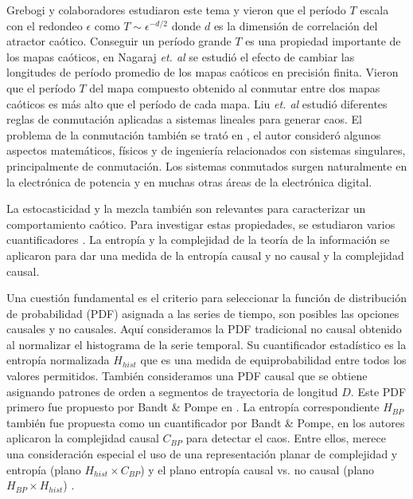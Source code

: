 Grebogi y colaboradores \cite{Grebogi1988} estudiaron este tema y vieron que el período $T$ escala con el redondeo $\epsilon$ como $T\sim\epsilon^{-d/2}$ donde $d$ es la dimensión de correlación del atractor caótico.
Conseguir un período grande $T$ es una propiedad importante de los mapas caóticos, en \cite{Nagaraj2008} Nagaraj \textit{et. al} se estudió el efecto de cambiar las longitudes de período promedio de los mapas caóticos en precisión finita.
Vieron que el período $T$ del mapa compuesto obtenido al conmutar entre dos mapas caóticos es más alto que el período de cada mapa.
Liu \textit{et. al} \cite{Liu2006} estudió diferentes reglas de conmutación aplicadas a sistemas lineales para generar caos.
El problema de la conmutación también se trató en \cite{Gluskin2008}, el autor consideró algunos aspectos matemáticos, físicos y de ingeniería relacionados con sistemas singulares, principalmente de conmutación.
Los sistemas conmutados surgen naturalmente en la electrónica de potencia y en muchas otras áreas de la electrónica digital.

La estocasticidad y la mezcla también son relevantes para caracterizar un comportamiento caótico.
Para investigar estas propiedades, se estudiaron varios cuantificadores \cite{DeMicco2009}.
La entropía y la complejidad de la teoría de la información se aplicaron para dar una medida de la entropía causal y no causal y la complejidad causal.

Una cuestión fundamental es el criterio para seleccionar la función de distribución de probabilidad (PDF) asignada a las series de tiempo, son posibles las opciones causales y no causales.
Aquí consideramos la PDF tradicional no causal obtenido al normalizar el histograma de la serie temporal.
Su cuantificador estadístico es la entropía normalizada $ H_ {hist} $ que es una medida de equiprobabilidad entre todos los valores permitidos.
También consideramos una PDF causal que se obtiene asignando patrones de orden a segmentos de trayectoria de longitud $D$.
Este PDF primero fue propuesto por Bandt \& Pompe en \cite{Bandt2002}.
La entropía correspondiente $H_{BP}$ también fue propuesta como un cuantificador por Bandt \& Pompe, en \cite{Rosso2007} los autores aplicaron la complejidad causal $C_{BP} $ para detectar el caos.
Entre ellos, merece una consideración especial el uso de una representación planar de complejidad y entropía (plano $H_{hist} \times C_{BP}$) y el plano entropía causal vs. no causal (plano $H_{BP} \times H_{hist}$) \cite{DeMicco2009, Rosso2007, Fouda2017, DeMicco2008, DeMicco2012, Rosso2010, Antonelli2017}.

